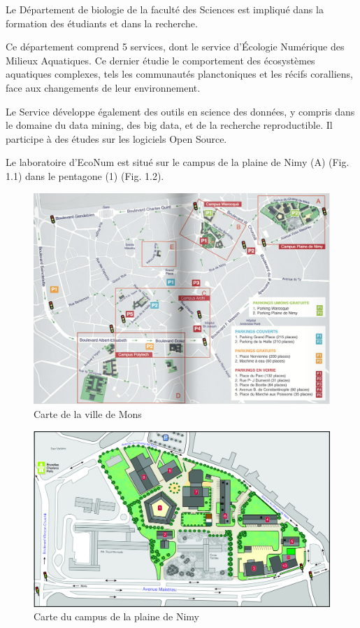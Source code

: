 \documentclass[]{report}
\begin{document}
Le Département de biologie de la faculté des Sciences est impliqué dans
la formation des étudiants et dans la recherche.

Ce département comprend 5 services, dont le service d'Écologie Numérique
des Milieux Aquatiques. Ce dernier étudie le comportement des
écosystèmes aquatiques complexes, tels les communautés planctoniques et
les récifs coralliens, face aux changements de leur environnement.

Le Service développe également des outils en science des données, y
compris dans le domaine du data mining, des big data, et de la recherche
reproductible. Il participe à des études sur les logiciels Open Source.

Le laboratoire d'EcoNum est situé sur le campus de la plaine de Nimy (A)
(Fig. 1.1) dans le pentagone (1) (Fig. 1.2).

\begin{figure}
\centering
\includegraphics{../image/plan-campus.png}
\caption{Carte de la ville de Mons}
\end{figure}

\begin{figure}
\centering
\includegraphics{../image/plaine-Nimy.jpg}
\caption{Carte du campus de la plaine de Nimy}
\end{figure}
\end{document}
